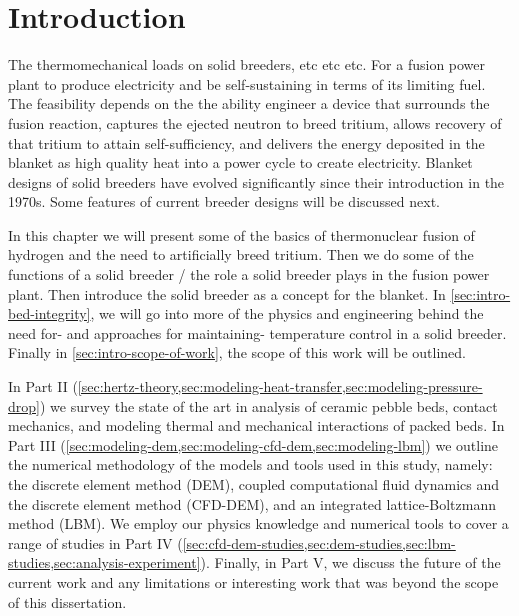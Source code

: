 \chapter{Introduction} \label{sec:introduction}
The thermomechanical loads on solid breeders, etc etc etc. For a fusion power plant to produce electricity and be self-sustaining in terms of its limiting fuel. The feasibility depends on the the ability engineer a device that surrounds the fusion reaction, captures the ejected neutron to breed tritium, allows recovery of that tritium to attain self-sufficiency, and delivers the energy deposited in the blanket as high quality heat into a power cycle to create electricity. Blanket designs of solid breeders have evolved significantly since their introduction in the 1970s. Some features of current breeder designs will be discussed next.

In this chapter we will present some of the basics of thermonuclear fusion of hydrogen and the need to artificially breed tritium.  Then we do some of the functions of a solid breeder / the role a solid breeder plays in the fusion power plant. Then introduce the solid breeder as a concept for the blanket. In \cref{sec:intro-bed-integrity}, we will go into more of the physics and engineering behind the need for- and approaches for maintaining- temperature control in a solid breeder. Finally in \cref{sec:intro-scope-of-work}, the scope of this work will be outlined.











In Part II (\cref{sec:hertz-theory,sec:modeling-heat-transfer,sec:modeling-pressure-drop}) we survey the state of the art in analysis of ceramic pebble beds, contact mechanics, and modeling thermal and mechanical interactions of packed beds.  In Part III (\cref{sec:modeling-dem,sec:modeling-cfd-dem,sec:modeling-lbm}) we outline the numerical methodology of the models and tools used in this study, namely: the discrete element method (DEM), coupled computational fluid dynamics and the discrete element method (CFD-DEM), and an integrated lattice-Boltzmann method (LBM). We employ our physics knowledge and numerical tools to cover a range of studies in Part IV (\cref{sec:cfd-dem-studies,sec:dem-studies,sec:lbm-studies,sec:analysis-experiment}). Finally, in Part V, we discuss the future of the current work and any limitations or interesting work that was beyond the scope of this dissertation.